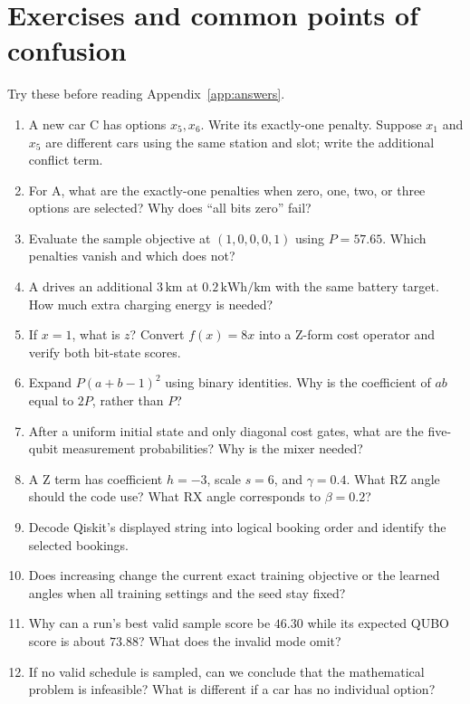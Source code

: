 \section{Exercises and common points of confusion}
Try these before reading Appendix~\ref{app:answers}.
\begin{enumerate}[label=\textbf{\arabic*.}]
\item A new car C has options $x_5,x_6$. Write its exactly-one penalty. Suppose
      $x_1$ and $x_5$ are different cars using the same station and slot; write
      the additional conflict term.
\item For A, what are the exactly-one penalties when zero, one, two, or three
      options are selected? Why does ``all bits zero'' fail?
\item Evaluate the sample objective at $(1,0,0,0,1)$ using $P=57.65$.
      Which penalties vanish and which does not?
\item A drives an additional $3\,\mathrm{km}$ at $0.2\,\mathrm{kWh/km}$ with
      the same battery target. How much extra charging energy is needed?
\item If $x=1$, what is $z$? Convert $f(x)=8x$ into a Z-form cost operator
      and verify both bit-state scores.
\item Expand $P(a+b-1)^2$ using binary identities. Why is the coefficient of
      $ab$ equal to $2P$, rather than $P$?
\item After a uniform initial state and only diagonal cost gates, what are
      the five-qubit measurement probabilities? Why is the mixer needed?
\item A Z term has coefficient $h=-3$, scale $s=6$, and $\gamma=0.4$.
      What RZ angle should the code use? What RX angle corresponds to $\beta=0.2$?
\item Decode Qiskit's displayed string  into logical booking order
      and identify the selected bookings.
\item Does increasing  change the current exact training objective
      or the learned angles when all training settings and the seed stay fixed?
\item Why can a run's best valid sample score be $46.30$ while its expected QUBO
      score is about $73.88$? What does the invalid mode  omit?
\item If no valid schedule is sampled, can we conclude that the mathematical
      problem is infeasible? What is different if a car has no individual option?
\end{enumerate}

